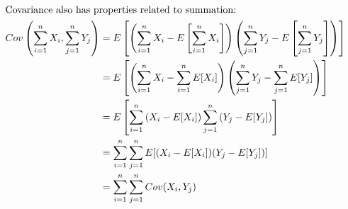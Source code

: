 \documentclass{article}
\begin{document}
\begin{align*}
    \intertext{Covariance also has properties related to summation:}
    Cov\left(\sum_{i=1}^n X_i, \sum_{j=1}^n Y_j\right) & = E\left[\left(\sum_{i=1}^n X_i-E\left[\sum_{i=1}^n X_i\right]\right)\left(\sum_{j=1}^n Y_j-E\left[\sum_{j=1}^n Y_j\right]\right)\right] \\
                                                       & = E\left[\left(\sum_{i=1}^n X_i-\sum_{i=1}^nE[X_i]\right)\left(\sum_{j=1}^n Y_j-\sum_{j=1}^nE[Y_j]\right)\right]                         \\
                                                       & = E\left[\sum_{i=1}^n \left(X_i-E[X_i]\right) \sum_{j=1}^n \left(Y_j-E[Y_j]\right)\right]                                                \\
                                                       & = \sum_{i=1}^n \sum_{j=1}^n E[(X_i-E[X_i])(Y_j-E[Y_j])]                                                                                  \\
                                                       & = \sum_{i=1}^n \sum_{j=1}^n Cov(X_i, Y_j)
\end{align*}
\end{document}
